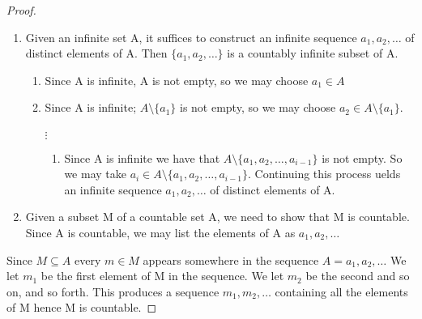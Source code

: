 \documentclass[../MATH-2000-Notes.tex]{subfiles}
\begin{document}
\begin{proof}~\\
    \begin{enumerate}
        \item Given an infinite set A, it suffices to construct an infinite sequence \(a_1,a_2,\dots\) of distinct elements of A. Then \(\{a_1,a_2,\dots\}\) is a countably infinite subset of A.
              \begin{enumerate}
                  \item Since A is infinite, A is not empty, so we may choose \(a_1 \in A\)
                  \item Since A is infinite; \(A\setminus \{a_1\}\) is not empty, so we may choose \(a_2 \in A \setminus \{a_1\}\).\\~\\ \(\vdots\)
                        \begin{enumerate}
                            \item Since A is infinite we have that \(A \setminus \{a_1,a_2,\dots,a_{i-1}\}\) is not empty. So we may take \(a_i \in A \setminus \{a_1,a_2,\dots,a_{i-1}\}\). Continuing this process uelds an infinite sequence \(a_1,a_2,\dots\) of distinct elements of A.
                        \end{enumerate}
              \end{enumerate}
        \item Given a subset M of a countable set A, we need to show that M is countable. Since A is countable, we may list the elements of A as \(a_1,a_2,\dots\)
    \end{enumerate}
    Since \(M\subseteq A\) every \(m\in M\) appears somewhere in the sequence \(A = a_1,a_2,\dots\) We let \(m_1\) be the first element of M in the sequence. We let \(m_2\) be the second and so on, and so forth. This produces a sequence \(m_1,m_2,\dots\) containing all the elements of M hence M is countable.
\end{proof}
\end{document}
